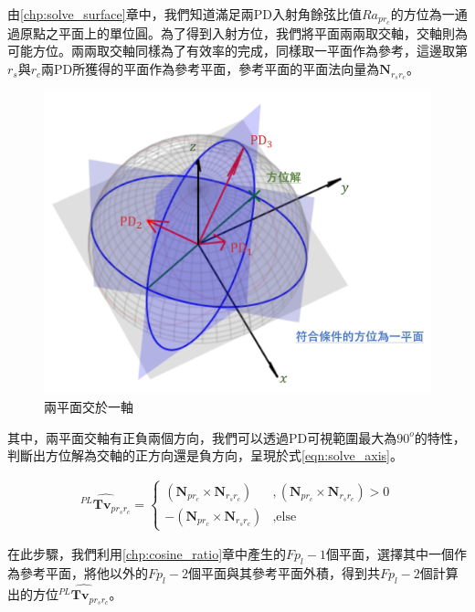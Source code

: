         由\ref{chp:solve_surface}章中，我們知道滿足兩PD入射角餘弦比值$Ra_{pr_c}$的方位為一通過原點之平面上的單位圓。為了得到入射方位，我們將平面兩兩取交軸，交軸則為可能方位。兩兩取交軸同樣為了有效率的完成，同樣取一平面作為參考，這邊取第$r_s$與$r_c$兩PD所獲得的平面作為參考平面，參考平面的平面法向量為$\boldsymbol{N}_{r_sr_c}$。
        
        \begin{figure}[htpb]
            \centering
            \includegraphics[width=12cm]{ch3pic/solve_axis.png}
            \caption{兩平面交於一軸}
            \label{pic:solve_axis}
        \end{figure}

        \noindent 其中，兩平面交軸有正負兩個方向，我們可以透過PD可視範圍最大為$90^o$的特性，判斷出方位解為交軸的正方向還是負方向，呈現於式\ref{eqn:solve_axis}。
   
        \begin{gather}
            \label{eqn:solve_axis}
             \hat{{^{PL}\boldsymbol{Tv}}_{p{r_sr_c}}} = 
             \begin{cases}
                (\boldsymbol{N}_{pr_c}\times \boldsymbol{N}_{r_sr_c})&,(\boldsymbol{N}_{pr_c}\times \boldsymbol{N}_{r_sr_c})>0\\
                -(\boldsymbol{N}_{pr_c}\times \boldsymbol{N}_{r_sr_c})&,\text{else}
             \end{cases}
        \end{gather}

        在此步驟，我們利用\ref{chp:cosine_ratio}章中產生的$Fp_l-1$個平面，選擇其中一個作為參考平面，將他以外的$Fp_l-2$個平面與其參考平面外積，得到共$Fp_l-2$個計算出的方位$\hat{{^{PL}\boldsymbol{Tv}}_{p{r_sr_c}}}$。


